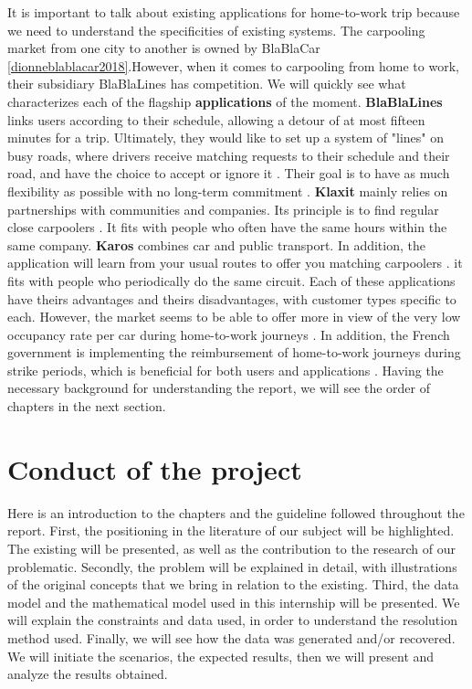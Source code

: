 \documentclass[12pt, a4paper,twoside]{memoir}
\newcommand{\newpar}{\vskip 0.2in \noindent}
\begin{document}
	It is important to talk about existing applications for home-to-work trip because we need to understand the specificities of existing systems.\newline
	The carpooling market from one city to another is owned by BlaBlaCar \ref{dionneblablacar2018}.However, when it comes to carpooling from home to work, their subsidiary BlaBlaLines has competition. We will quickly see what characterizes each of the flagship \textbf{applications} of the moment.
	\newpar
	\textbf{BlaBlaLines} links users according to their schedule, allowing a detour of at most fifteen minutes for a trip. Ultimately, they would like to set up a system of "lines" on busy roads, where drivers receive matching requests to their schedule and their road, and have the choice to accept or ignore it \cite{noauthorblablalines2017}. Their goal is to have as much flexibility as possible with no long-term commitment .
	\newpar
	\textbf{Klaxit} mainly relies on partnerships with communities and companies. Its principle is to find regular close carpoolers \cite{ARNULFKlaxit2018}. It fits with people who often have the same hours within the same company.
	\newpar
	\textbf{Karos} combines car and public transport. In addition, the application will learn from your usual routes to offer you matching carpoolers \cite{noauthorkaros2016}.
it fits with people who periodically do the same circuit.
	\newpar
	Each of these applications have theirs advantages and theirs disadvantages, with customer types specific to each. However, the market seems to be able to offer more in view of the very low occupancy rate per car during home-to-work journeys \cite{noauthoroccupancy2008}. \newline
	In addition, the French government is implementing the reimbursement of home-to-work journeys during strike periods, which is beneficial for both users and applications \cite{noauthorgreve2018}.
	\newpar
	Having the necessary background for understanding the report, we will see the order of chapters in the next section.
	\section*{Conduct of the project}
	Here is an introduction to the chapters and the guideline followed throughout the report.
	\newpar
	First, the positioning in the literature of our subject will be highlighted. The existing will be presented, as well as the contribution to the research of our problematic.\newline
	Secondly, the problem will be explained in detail, with illustrations of the original concepts that we bring in relation to the existing.\newline
	Third, the data model and the mathematical model used in this internship will be presented. We will explain the constraints and data used, in order to understand the resolution method used.\newline
	Finally, we will see how the data was generated and/or recovered. We will initiate the scenarios, the expected results, then we will present and analyze the results obtained.
	
\end{document}
